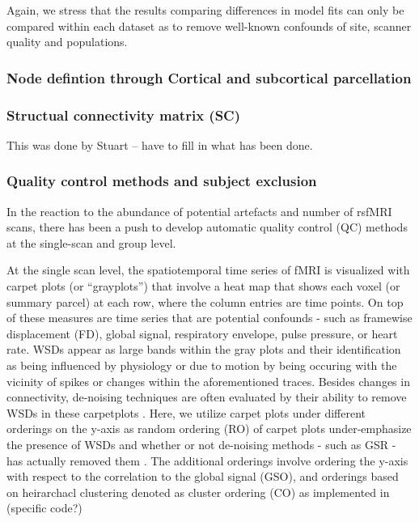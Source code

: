 \documentclass[oneside]{zHenriquesLab-StyleBioRxiv}
\begin{document}
Again, we stress that the results comparing differences in model fits can only be compared within each dataset as to remove well-known confounds of site, scanner quality and populations.

\subsubsection*{Node defintion through Cortical and subcortical parcellation}

\subsubsection*{Structual connectivity matrix (SC)} This was done by Stuart -- have to fill in what has been done.

\subsubsection*{Quality control methods and subject exclusion} 
In the reaction to the abundance of potential artefacts and number of rsfMRI scans, there has been a push to develop automatic quality control (QC) methods at the single-scan and group level. 


At the single scan level, the spatiotemporal time series of fMRI is visualized with carpet plots (or ``grayplots'') that involve a heat map that shows each voxel (or summary parcel) at each row, where the column entries are time points. On top of these measures are time series that are potential confounds - such as framewise displacement (FD), global signal, respiratory envelope, pulse pressure, or heart rate. WSDs appear as large bands within the gray plots and their identification as being influenced by physiology or due to motion by being occuring with the vicinity of spikes or changes within the aforementioned traces. Besides changes in connectivity, de-noising techniques are often evaluated by their ability to remove WSDs in these carpetplots \cite{power2019temporal,power2018ridding,power2017sources}. Here, we utilize carpet plots under different orderings on the y-axis as random ordering (RO) of carpet plots under-emphasize the presence of WSDs and whether or not de-noising methods - such as GSR - has actually removed them \cite{aquino2019identifying}. The additional orderings involve ordering the y-axis with respect to the correlation to the global signal (GSO), and orderings based on heirarchacl clustering denoted as cluster ordering (CO) as implemented in (specific code?)
\end{document}
